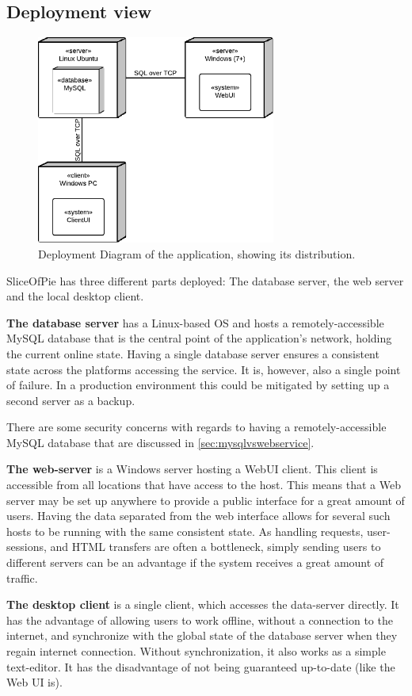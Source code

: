 \subsection{Deployment view}
\label{sec:deployment}

\begin{figure}[htb]
	\centering
	\includegraphics[width=0.7\textwidth]{Software_architecture/graphics/deployment-diag.png}
	\caption{Deployment Diagram of the application, showing its distribution.}
	\label{fig:deployment-diag}
\end{figure}

SliceOfPie has three different parts deployed: The database server, the web server and the local
desktop client.

{\bf The database server} has a Linux-based OS and hosts a remotely-accessible MySQL database
that is the central point of the application's network, holding the current online state. Having
a single database server ensures a consistent state across the platforms accessing the service.
It is, however, also a single point of failure. In a production environment this could be mitigated
by setting up a second server as a backup.

There are some security concerns with regards to having a remotely-accessible MySQL database that are
discussed in \ref{sec:mysqlvswebservice}.

{\bf The web-server} is a Windows server hosting a WebUI client. This client is accessible from all
locations that have access to the host. This means that a Web server may be set up anywhere to provide
a public interface for a great amount of users. Having the data separated from the web interface allows
for several such hosts to be running with the same consistent state. As handling requests, user-sessions,
and HTML transfers are often a bottleneck, simply sending users to different servers can be an advantage if the system receives a great
amount of traffic.

{\bf The desktop client} is a single client, which accesses the data-server directly. It has the advantage
of allowing users to work offline, without a connection to the internet, and synchronize with the global
state of the database server when they regain internet connection. Without synchronization, it also works
as a simple text-editor. It has the disadvantage of not being guaranteed up-to-date (like the Web UI is).